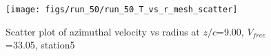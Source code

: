 \begin{figure}[H]
\centering
\texttt{[image: figs/run\_50/run\_50\_T\_vs\_r\_mesh\_scatter]}
\caption{Scatter plot of azimuthal velocity vs radius at $z/c$=9.00, $V_{free}$=33.05, station5}
\label{fig:run_50_T_vs_r_mesh_scatter}
\end{figure}


